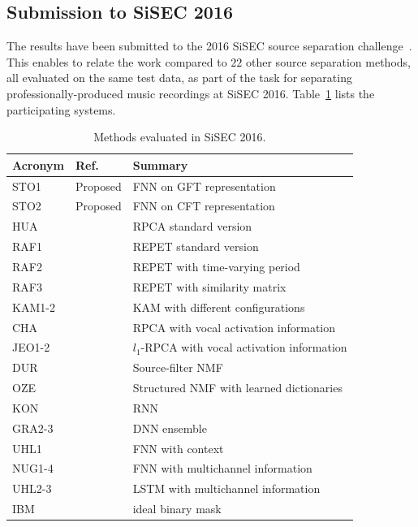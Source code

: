\subsection{Submission to SiSEC 2016}
\label{ssec:performance}

The results have been submitted to the 2016 SiSEC source separation challenge~\cite{sisec16}.
This enables to relate the work compared to $22$ other source separation methods, all evaluated on the same test data, as part of the task for separating professionally-produced music recordings at SiSEC 2016.
Table~\ref{tab:sisec_systems} lists the participating systems.
\begin{table}[htbp]
  \centering
  \scriptsize
    \begin{tabular}{lll@{}}
        \hline
        \textbf{Acronym} & \textbf{Ref.} & \textbf{Summary}\\
        \hline
        STO1 & Proposed & FNN on GFT representation \\
        STO2 & Proposed & FNN on CFT representation \\
        HUA & \cite{huang12} & RPCA standard version \\
        RAF1 & \cite{rafii13} & REPET standard version \\
        RAF2 & \cite{liutkus12} & REPET with time-varying period \\
        RAF3 & \cite{rafii12} & REPET with similarity matrix \\
        KAM1-2 & \cite{liutkus15} & KAM with different configurations \\
        CHA & \cite{chan15} & RPCA with vocal activation information \\
        JEO1-2 & \cite{jeong17} &  $l_1$-RPCA with vocal activation information \\
        DUR & \cite{durrieu11} & Source-filter NMF \\
        OZE & \cite{salaun14} & Structured NMF with learned dictionaries \\
        KON & \cite{huang15} & RNN \\
        GRA2-3 & \cite{grais16} & DNN ensemble \\
        UHL1 & \cite{uhlich15} & FNN with context \\
        NUG1-4 & \cite{nugraha16} & FNN with multichannel information \\
        UHL2-3 & \cite{uhlich17} & LSTM with multichannel information \\
        IBM & & ideal binary mask \\
  \end{tabular}
     \caption{Methods evaluated in SiSEC 2016.}
    \label{tab:sisec_systems}

\end{table}

